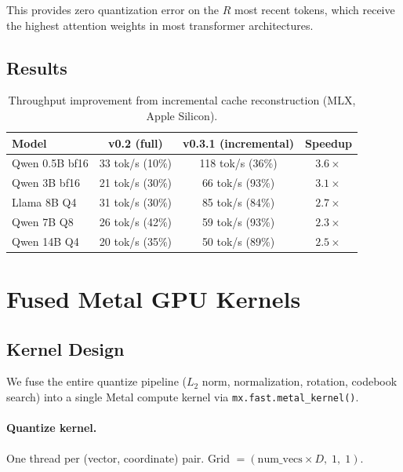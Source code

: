 \documentclass[11pt,a4paper]{article}
\begin{document}
This provides zero quantization error on the $R$ most recent tokens, which receive the highest attention weights in most transformer architectures.

\subsection{Results}

\begin{table}[h]
\centering
\caption{Throughput improvement from incremental cache reconstruction (MLX, Apple Silicon).}
\label{tab:incremental-results}
\begin{tabular}{lccc}
\toprule
\textbf{Model} & \textbf{v0.2 (full)} & \textbf{v0.3.1 (incremental)} & \textbf{Speedup} \\
\midrule
Qwen 0.5B bf16 & 33 tok/s (10\%) & 118 tok/s (36\%) & $\mathbf{3.6\times}$ \\
Qwen 3B bf16   & 21 tok/s (30\%) & 66 tok/s (93\%)  & $\mathbf{3.1\times}$ \\
Llama 8B Q4    & 31 tok/s (30\%) & 85 tok/s (84\%)  & $\mathbf{2.7\times}$ \\
Qwen 7B Q8    & 26 tok/s (42\%) & 59 tok/s (93\%)  & $\mathbf{2.3\times}$ \\
Qwen 14B Q4   & 20 tok/s (35\%) & 50 tok/s (89\%)  & $\mathbf{2.5\times}$ \\
\bottomrule
\end{tabular}
\end{table}

\section{Fused Metal GPU Kernels}

\subsection{Kernel Design}

We fuse the entire quantize pipeline ($L_2$ norm, normalization, rotation, codebook search) into a single Metal compute kernel via \texttt{mx.fast.metal\_kernel()}.

\paragraph{Quantize kernel.} One thread per (vector, coordinate) pair. Grid $= (\text{num\_vecs} \times D,\; 1,\; 1)$.
\end{document}
